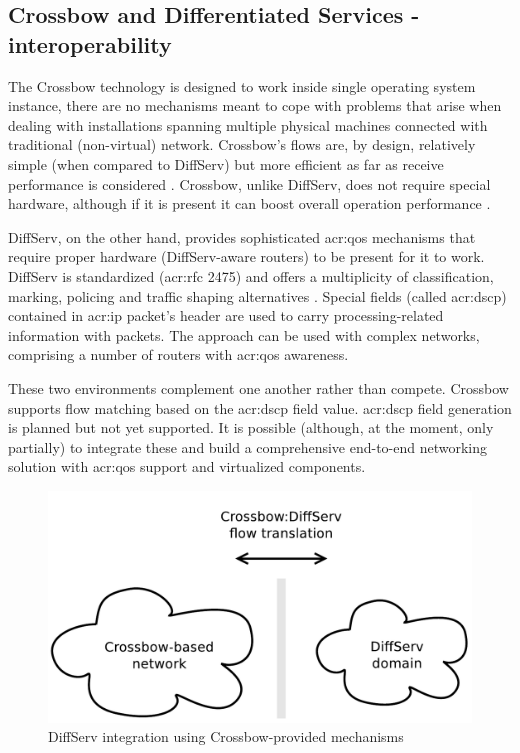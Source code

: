\documentclass[11pt]{book}
\begin{document}
      \subsection{Crossbow and Differentiated Services - interoperability}
      \label{sub:sol:diffserv}

        The Crossbow technology is designed to work inside single operating system instance, there are no mechanisms
        meant to cope with problems that arise when dealing with installations spanning multiple physical machines
        connected with traditional (non-virtual) network. Crossbow's flows are, by design, relatively simple (when
        compared to DiffServ) but more efficient as far as receive performance is considered \cite{xbow-vertically}.
        Crossbow, unlike DiffServ, does not require special hardware, although if it is present it can boost overall
        operation performance \cite{xbow-vertically}.

        DiffServ, on the other hand, provides sophisticated \gls{acr:qos} mechanisms that require proper hardware
        (DiffServ-aware routers) to be present for it to work. DiffServ is standardized (\gls{acr:rfc} 2475) and offers
        a multiplicity of classification, marking, policing and traffic shaping alternatives \cite{rfc2475}. Special
        fields (called \gls{acr:dscp}) contained in \gls{acr:ip} packet's header are used to carry processing-related
        information with packets. The approach can be used with complex networks, comprising a number of routers with
        \gls{acr:qos} awareness.

        These two environments complement one another rather than compete. Crossbow supports flow matching based on the
        \gls{acr:dscp} field value. \gls{acr:dscp} field generation is planned but not yet supported. It is possible
        (although, at the moment, only partially) to integrate these and build a comprehensive end-to-end networking
        solution with \gls{acr:qos} support and virtualized components.

        \begin{figure}[H]
          \begin{center}
            \includegraphics[width=.7\textwidth]{img/solaris/xbow-diffserv.pdf}
          \end{center}

          \caption{DiffServ integration using Crossbow-provided mechanisms}
        \end{figure}
\end{document}
